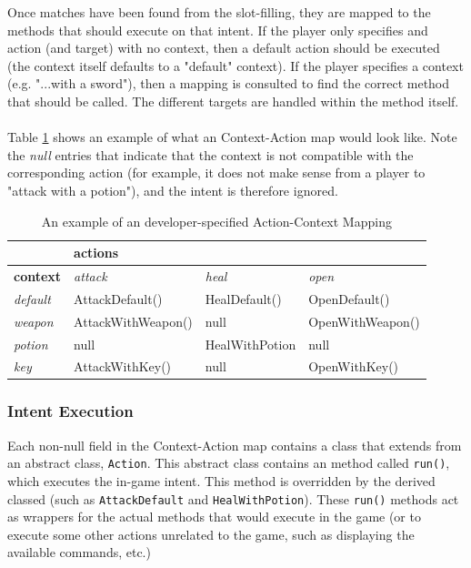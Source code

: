 \documentclass[12pt]{article}
\begin{document}
Once matches have been found from the slot-filling, they are mapped to the methods that should execute on that intent. If the player only specifies and action (and target) with no context, then a default action should be executed (the context itself defaults to a "default" context). If the player specifies a context (e.g. "...with a sword"), then a mapping is consulted to find the correct method that should be called. The different targets are handled within the method itself.
\\
\\
Table \ref{action-context-ex-table} shows an example of what an Context-Action map would look like. Note the \textit{null} entries that indicate that the context is not compatible with the corresponding action (for example, it does not make sense from a player to "attack with a potion"), and the intent is therefore ignored.

\begin{table}[H]
\centering
\caption{An example of an developer-specified Action-Context Mapping}
\label{action-context-ex-table}
\begin{tabular}{l|l|l|l|}
\cline{2-4}
\multicolumn{1}{c|}{\textbf{}}         & \multicolumn{3}{l|}{\textbf{actions}}                  \\ \hline
\multicolumn{1}{|l|}{\textbf{context}} & \textit{attack}    & \textit{heal}  & \textit{open}    \\ \hline
\multicolumn{1}{|l|}{\textit{default}} & AttackDefault()    & HealDefault()  & OpenDefault()    \\ \hline
\multicolumn{1}{|l|}{\textit{weapon}}  & AttackWithWeapon() & null           & OpenWithWeapon() \\ \hline
\multicolumn{1}{|l|}{\textit{potion}}  & null               & HealWithPotion & null             \\ \hline
\multicolumn{1}{|l|}{\textit{key}}     & AttackWithKey()    & null           & OpenWithKey()   \\ \hline
\end{tabular}
\end{table}

\subsubsection{Intent Execution}

Each non-null field in the Context-Action map contains a class that extends from an abstract class, \texttt{Action}. This abstract class contains an method called \texttt{run()}, which executes the in-game intent. This method is overridden by the derived classed (such as \texttt{AttackDefault} and \texttt{HealWithPotion}). These \texttt{run()} methods act as wrappers for the actual methods that would execute in the game (or to execute some other actions unrelated to the game, such as displaying the available commands, etc.)
\end{document}
